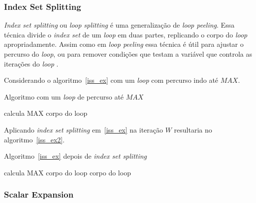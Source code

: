 \subsubsection{Index Set Splitting}

\textit{Index set splitting} ou \textit{loop splitting} é uma generalização de 
\textit{loop peeling}. Essa técnica divide o \textit{index set} de um
\textit{loop} em duas partes, replicando o corpo do \textit{loop}
apropriadamente. 
Assim como em \textit{loop peeling} essa técnica é útil para ajustar o percurso
do \textit{loop}, ou para remover condições que testam a variável que controla
as iterações do \textit{loop} \cite{Ghodrat:2008} \cite{Tasharofi:2010}.

Considerando o algoritmo~\ref{iss_ex} com um \textit{loop} com percurso indo
até $MAX$.

\begin{algorithm}
\caption{Algoritmo com um \textit{loop} de percurso até $MAX$}
\label{iss_ex}
\begin{algorithmic}[1]

\STATE calcula MAX
\STATE corpo do loop
\ENDFOR

\end{algorithmic}
\end{algorithm}

Aplicando \textit{index set splitting} em~\ref{iss_ex} na iteração $W$
resultaria no algoritmo~\ref{iss_ex2}.

\begin{algorithm}
\caption{Algoritmo~\ref{iss_ex} depois de \textit{index set splitting}}
\label{iss_ex2}
\begin{algorithmic}[1]

\STATE calcula MAX
\STATE corpo do loop
\ENDFOR
{}
\STATE corpo do loop
\ENDFOR

\end{algorithmic}
\end{algorithm}


\subsubsection{Scalar Expansion} 

